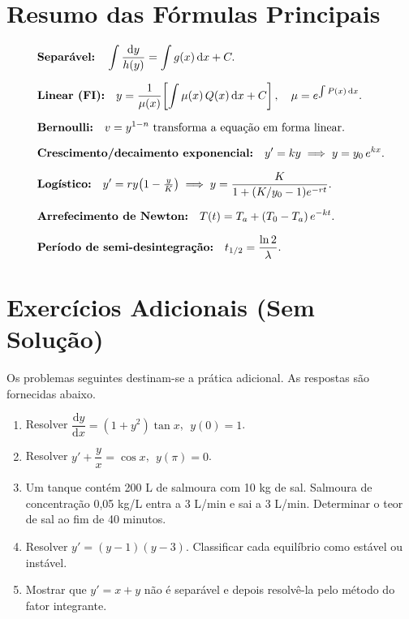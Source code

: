 \documentclass[12pt, a4paper]{article}
\newcommand{\dd}{\mathrm{d}}
\begin{document}
\section{Resumo das Fórmulas Principais}
\label{sec:formulas}

\begin{tcolorbox}[
  colback=softgray, colframe=gray!60,
  title={\textbf{Formulário Essencial}},
  fonttitle=\bfseries,
  attach boxed title to top left={yshift=-2mm, xshift=4mm},
  boxed title style={colback=gray!60, rounded corners, size=small}
]
  \begin{align*}
    &\text{\textbf{Separável:}} \quad
     \int \frac{\dd y}{h(y)} = \int g(x)\,\dd x + C. \\[6pt]
    &\text{\textbf{Linear (FI):}} \quad
     y = \frac{1}{\mu(x)}\!\left[\int \mu(x)\,Q(x)\,\dd x + C\right],
     \quad \mu = e^{\int P(x)\,\dd x}. \\[6pt]
    &\text{\textbf{Bernoulli:}} \quad
     v = y^{1-n} \text{ transforma a equação em forma linear.} \\[6pt]
    &\text{\textbf{Crescimento/decaimento exponencial:}} \quad
     y' = ky \implies y = y_0\,e^{kx}. \\[6pt]
    &\text{\textbf{Logístico:}} \quad
     y' = ry\!\left(1-\tfrac{y}{K}\right) \implies
     y = \dfrac{K}{1+(K/y_0-1)e^{-rt}}. \\[6pt]
    &\text{\textbf{Arrefecimento de Newton:}} \quad
     T(t) = T_a + (T_0-T_a)\,e^{-kt}. \\[6pt]
    &\text{\textbf{Período de semi-desintegração:}} \quad
     t_{1/2} = \dfrac{\ln 2}{\lambda}.
  \end{align*}
\end{tcolorbox}

\appendix
\section{Exercícios Adicionais (Sem Solução)}
\label{app:extra}

Os problemas seguintes destinam-se a prática adicional. As respostas são fornecidas abaixo.

\begin{enumerate}
  \item Resolver $\dfrac{\dd y}{\dd x} = (1+y^2)\tan x$, $\;y(0)=1$.
  \item Resolver $y' + \dfrac{y}{x} = \cos x$, $\;y(\pi)=0$.
  \item Um tanque contém 200 L de salmoura com 10 kg de sal. Salmoura de concentração
        0{,}05 kg/L entra a 3 L/min e sai a 3 L/min. Determinar o teor de sal ao fim
        de 40 minutos.
  \item Resolver $y' = (y-1)(y-3)$. Classificar cada equilíbrio como estável ou instável.
  \item Mostrar que $y' = x + y$ não é separável e depois resolvê-la pelo método do
        fator integrante.
\end{enumerate}
\end{document}
